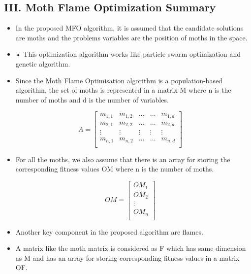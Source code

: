 \documentclass[12pt,a4paper]{report}
\begin{document}
\subsection*{III.\hspace{5pt}	Moth Flame Optimization Summary}
\begin{itemize}

\item In the proposed MFO algorithm, it is assumed that the candidate solutions are moths and the problems variables are the position of moths in the space. 

\item •	This optimization algorithm works like particle swarm optimization and genetic algorithm.

\item Since the Moth Flame Optimisation algorithm is a population-based algorithm, the set of moths is represented in a matrix M where n is the number of moths and d is the number of variables.

$$
A =
\begin{bmatrix} 
m_{1,1} & m_{1,2} & \dots & \dots & m_{1,d} \\
m_{2,1} & m_{2,2} & \dots & \dots & m_{2,d}\\
\vdots  & \vdots  & \vdots & \vdots &\vdots\\
m_{n,1} & m_{n,2} & \dots & \dots & m_{n,d} \\
\end{bmatrix}
\quad
$$

\item For all the moths, we also assume that there is an array for storing the corresponding fitness values OM where n is the number of moths.

$$
OM = 
\begin{bmatrix} 
OM_{1}\\
OM_{2}\\
\vdots\\
OM_{n}\\
\end{bmatrix}
\quad
$$

\item Another key component in the proposed algorithm are flames. 

\item A matrix like the moth matrix is considered as F which has same dimension as M and has an array for storing corresponding fitness values in a matrix OF.


\end{itemize}
\end{document}
